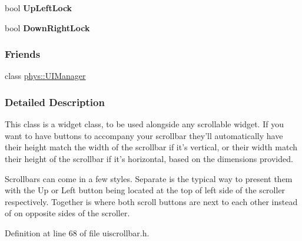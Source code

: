 \begin{DoxyCompactItemize}
\item 
\hypertarget{classphys_1_1UI_1_1Scrollbar_a10a45c7c3aad71f760b419412786eb8c}{
bool {\bfseries UpLeftLock}}
\label{d0/d3e/classphys_1_1UI_1_1Scrollbar_a10a45c7c3aad71f760b419412786eb8c}

\item 
\hypertarget{classphys_1_1UI_1_1Scrollbar_a133c6d99a33147a62826f0e0c925fcec}{
bool {\bfseries DownRightLock}}
\label{d0/d3e/classphys_1_1UI_1_1Scrollbar_a133c6d99a33147a62826f0e0c925fcec}

\end{DoxyCompactItemize}
\subsubsection*{Friends}
\begin{DoxyCompactItemize}
\item 
\hypertarget{classphys_1_1UI_1_1Scrollbar_a4b52bf8c4d934bf192ccfc8198b55394}{
class \hyperlink{classphys_1_1UI_1_1Scrollbar_a4b52bf8c4d934bf192ccfc8198b55394}{phys::UIManager}}
\label{d0/d3e/classphys_1_1UI_1_1Scrollbar_a4b52bf8c4d934bf192ccfc8198b55394}

\end{DoxyCompactItemize}


\subsubsection{Detailed Description}
This class is a widget class, to be used alongside any scrollable widget. If you want to have buttons to accompany your scrollbar they'll automatically have their height match the width of the scrollbar if it's vertical, or their width match their height of the scrollbar if it's horizontal, based on the dimensions provided. \par
 Scrollbars can come in a few styles. Separate is the typical way to present them with the Up or Left button being located at the top of left side of the scroller respectively. Together is where both scroll buttons are next to each other instead of on opposite sides of the scroller. 

Definition at line 68 of file uiscrollbar.h.



